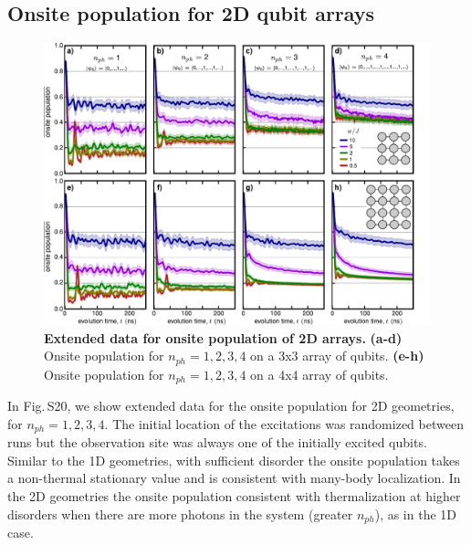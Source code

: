 \subsection{Onsite population for 2D qubit arrays}
\begin{figure}[tbh]
\centering
\includegraphics[width=175mm, keepaspectratio]{./PDF/population_2d_190915_1018a.pdf}
\caption{\textbf{Extended data for onsite population of 2D arrays.}
\textbf{(a-d)} Onsite population for $n_{ph} = 1,2,3,4$ on a 3x3 array of qubits.
\textbf{(e-h)} Onsite population for $n_{ph} = 1,2,3,4$ on a 4x4 array of qubits.}
\end{figure}

In Fig.\,S20, we show extended data for the onsite population for 2D geometries, for $n_{ph}=1,2,3,4$.  The initial location of the excitations was randomized between runs but the observation site was always one of the initially excited qubits.  Similar to the 1D geometries, with sufficient disorder the onsite population takes a non-thermal stationary value and is consistent with many-body localization.  In the 2D geometries the onsite population consistent with thermalization at higher disorders when there are more photons in the system (greater $n_{ph}$), as in the 1D case.

